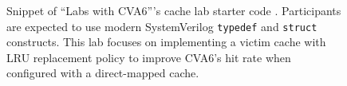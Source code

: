 
\begin{figure}[t]
    \centering
    \begin{minipage}{0.8\textwidth}
        \small
        \inputminted[frame=single,]{systemverilog}{media/code/cache_lab/cache.svh}
    \end{minipage}
    \caption[
        C-like constructs in ``Labs with CVA6''
    ]{
        Snippet of ``Labs with CVA6'''s cache lab starter code \cite{labsWithCVA6}. Participants are expected to use modern SystemVerilog \texttt{typedef} and \texttt{struct} constructs. This lab focuses on implementing a victim cache with LRU replacement policy to improve CVA6's hit rate when configured with a direct-mapped cache.
    }
    \label{fig:cache_lab}
\end{figure}
